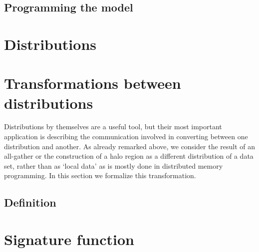 \documentclass[11pt,fleqn,preprint]{impreport}
\begin{document}
\subsection{Programming the model}


\section{Distributions}
\label{sec:distribution}



\section{Transformations between distributions}
\label{sec:alpha-beta}
Distributions by themselves are a useful tool, but
their most important application is describing
the communication involved in
converting between one distribution and another. 
As already remarked above, we consider the result 
of an all-gather or the construction of a halo region
as a different distribution of a data set,
rather than as `local data' 
as is mostly done in distributed memory
programming. In this section
we formalize this transformation.

\subsection{Definition}
\label{sec:u-inv-v}




\section{Signature function}
\label{sec:define-signature}




\end{document}
